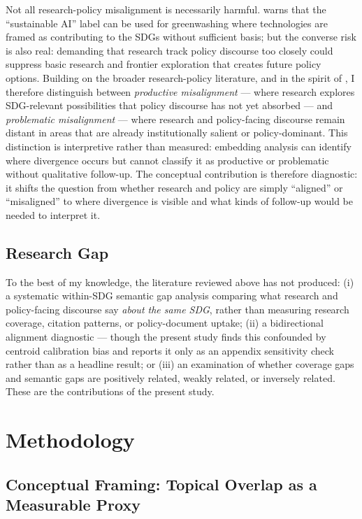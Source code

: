 \documentclass[12pt,a4paper]{article}
\begin{document}
Not all research-policy misalignment is necessarily harmful. \textcite{Heilinger2023} warns that the ``sustainable AI'' label can be used for greenwashing where technologies are framed as contributing to the SDGs without sufficient basis; but the converse risk is also real: demanding that research track policy discourse too closely could suppress basic research and frontier exploration that creates future policy options. Building on the broader research-policy literature, and in the spirit of \textcite{ToneyWails2024}, I therefore distinguish between \emph{productive misalignment} --- where research explores SDG-relevant possibilities that policy discourse has not yet absorbed --- and \emph{problematic misalignment} --- where research and policy-facing discourse remain distant in areas that are already institutionally salient or policy-dominant. This distinction is interpretive rather than measured: embedding analysis can identify where divergence occurs but cannot classify it as productive or problematic without qualitative follow-up. The conceptual contribution is therefore diagnostic: it shifts the question from whether research and policy are simply ``aligned'' or ``misaligned'' to where divergence is visible and what kinds of follow-up would be needed to interpret it.

\subsection{Research Gap}

To the best of my knowledge, the literature reviewed above has not produced: (i) a systematic within-SDG semantic gap analysis comparing what research and policy-facing discourse say \emph{about the same SDG}, rather than measuring research coverage, citation patterns, or policy-document uptake; (ii) a bidirectional alignment diagnostic --- though the present study finds this confounded by centroid calibration bias and reports it only as an appendix sensitivity check rather than as a headline result; or (iii) an examination of whether coverage gaps and semantic gaps are positively related, weakly related, or inversely related. These are the contributions of the present study.

\section{Methodology}
\label{sec:method}

\subsection{Conceptual Framing: Topical Overlap as a Measurable Proxy}
\end{document}
